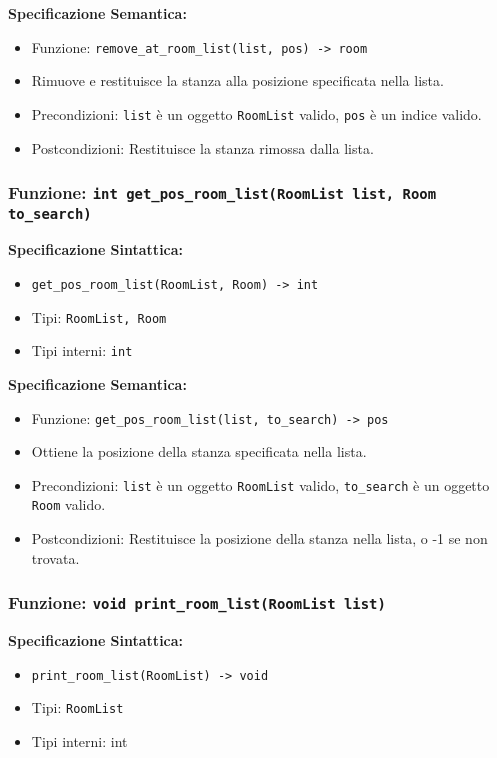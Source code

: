\documentclass[11pt]{scrartcl} %
\begin{document}
\textbf{Specificazione Semantica:}
\begin{itemize}
\item Funzione: \texttt{remove\_at\_room\_list(list, pos) -> room}
\item Rimuove e restituisce la stanza alla posizione specificata nella lista.
\item Precondizioni: \texttt{list} è un oggetto \texttt{RoomList} valido, \texttt{pos} è un indice valido.
\item Postcondizioni: Restituisce la stanza rimossa dalla lista.
\end{itemize}

\subsubsection{Funzione: \texttt{int get\_pos\_room\_list(RoomList list, Room to\_search)}}

\textbf{Specificazione Sintattica:}
\begin{itemize}
\item \texttt{get\_pos\_room\_list(RoomList, Room) -> int}
\item Tipi: \texttt{RoomList, Room}
\item Tipi interni: \texttt{int}
\end{itemize}

\textbf{Specificazione Semantica:}
\begin{itemize}
\item Funzione: \texttt{get\_pos\_room\_list(list, to\_search) -> pos}
\item Ottiene la posizione della stanza specificata nella lista.
\item Precondizioni: \texttt{list} è un oggetto \texttt{RoomList} valido, \texttt{to\_search} è un oggetto \texttt{Room} valido.
\item Postcondizioni: Restituisce la posizione della stanza nella lista, o -1 se non trovata.
\end{itemize}

\subsubsection{Funzione: \texttt{void print\_room\_list(RoomList list)}}

\textbf{Specificazione Sintattica:}
\begin{itemize}
\item \texttt{print\_room\_list(RoomList) -> void}
\item Tipi: \texttt{RoomList}
\item Tipi interni: int
\end{itemize}
\end{document}
